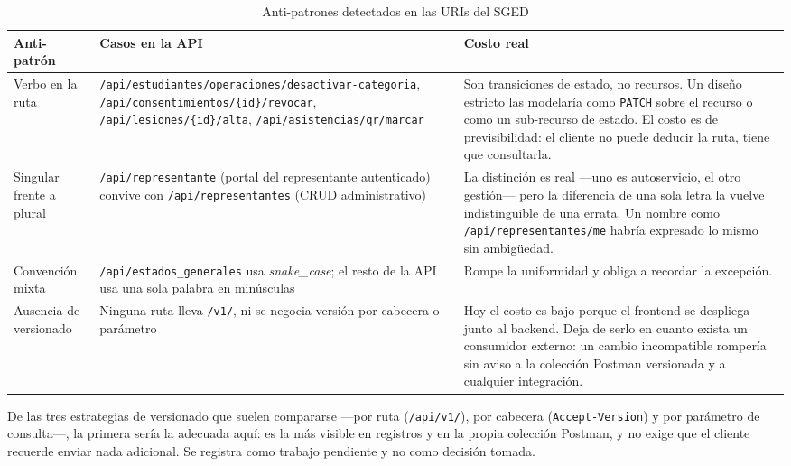 \documentclass[12pt,a4paper]{article}
\begin{document}
\begin{table}[h!]
  \centering
  \caption{Anti-patrones detectados en las URIs del SGED}
  \label{tab:uris}
  \begin{tabularx}{\linewidth}{@{}L{3.1cm}L{5.4cm}L{5.6cm}@{}}
    \toprule
    \textbf{Anti-patrón} & \textbf{Casos en la API} & \textbf{Costo real} \\
    \midrule
    Verbo en la ruta &
      \texttt{/api/estudiantes/operaciones/desactivar-categoria},
      \texttt{/api/consentimientos/\{id\}/revocar},
      \texttt{/api/lesiones/\{id\}/alta},
      \texttt{/api/asistencias/qr/marcar} &
      Son transiciones de estado, no recursos. Un diseño estricto las modelaría como
      \texttt{PATCH} sobre el recurso o como un sub-recurso de estado. El costo es de
      previsibilidad: el cliente no puede deducir la ruta, tiene que consultarla. \\[3pt]
    Singular frente a plural &
      \texttt{/api/representante} (portal del representante autenticado) convive con
      \texttt{/api/representantes} (CRUD administrativo) &
      La distinción es real ---uno es autoservicio, el otro gestión--- pero la diferencia de una
      sola letra la vuelve indistinguible de una errata. Un nombre como
      \texttt{/api/representantes/me} habría expresado lo mismo sin ambigüedad. \\[3pt]
    Convención mixta &
      \texttt{/api/estados\_generales} usa \textit{snake\_case}; el resto de la API usa una sola
      palabra en minúsculas &
      Rompe la uniformidad y obliga a recordar la excepción. \\[3pt]
    Ausencia de versionado &
      Ninguna ruta lleva \texttt{/v1/}, ni se negocia versión por cabecera o parámetro &
      Hoy el costo es bajo porque el frontend se despliega junto al backend. Deja de serlo en
      cuanto exista un consumidor externo: un cambio incompatible rompería sin aviso a la
      colección Postman versionada y a cualquier integración. \\
    \bottomrule
  \end{tabularx}
\end{table}

De las tres estrategias de versionado que suelen compararse ---por ruta (\texttt{/api/v1/}), por
cabecera (\texttt{Accept-Version}) y por parámetro de consulta---, la primera sería la adecuada
aquí: es la más visible en registros y en la propia colección Postman, y no exige que el cliente
recuerde enviar nada adicional. Se registra como trabajo pendiente y no como decisión tomada.
\end{document}
